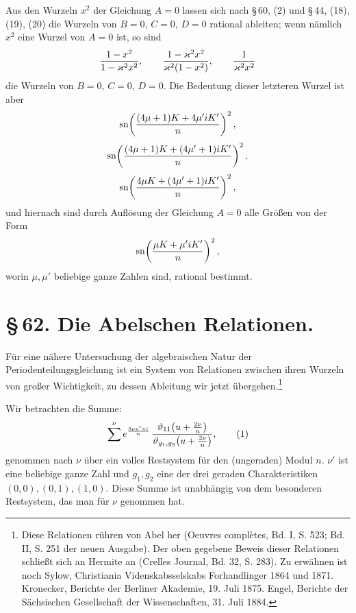 \documentclass[11pt]{article}
\providecommand{\sn}{\operatorname{sn}}
\begin{document}
Aus den Wurzeln $x^2$ der Gleichung $A=0$ lassen sich nach \S\,60, (2) und \S\,44,
(18), (19), (20) die Wurzeln von $B=0$, $C=0$, $D=0$ rational ableiten; wenn nämlich
$x^2$ eine Wurzel von $A=0$ ist, so sind
\[
{1-x^2\over1-\varkappa^2x^2},\qquad
{1-\varkappa^2x^2\over\varkappa^2(1-x^2)},\qquad
{1\over\varkappa^2x^2}
\]
die Wurzeln von $B=0$, $C=0$, $D=0$. Die Bedeutung dieser letzteren Wurzel ist aber
\[
\sn\!\left({(4\mu+1)K+4\mu'iK'\over n}\right)^2,
\]
\[
\sn\!\left({(4\mu+1)K+(4\mu'+1)iK'\over n}\right)^2,
\]
\[
\sn\!\left({4\mu K+(4\mu'+1)iK'\over n}\right)^2,
\]
und hiernach sind durch Auflösung der Gleichung $A=0$ alle Größen von der Form
\[
\sn\!\left({\mu K+\mu'iK'\over n}\right)^2,
\]
worin $\mu,\mu'$ beliebige ganze Zahlen sind, rational bestimmt.

\section*{\S\,62. Die Abelschen Relationen.}

Für eine nähere Untersuchung der algebraischen Natur der Periodenteilungsgleichung ist
ein System von Relationen zwischen ihren Wurzeln von großer Wichtigkeit, zu dessen
Ableitung wir jetzt übergehen.\footnote{Diese Relationen rühren von Abel her (Oeuvres
complètes, Bd. I, S. 523; Bd. II, S. 251 der neuen Ausgabe). Der oben gegebene Beweis
dieser Relationen schließt sich an Hermite an (Crelles Journal, Bd. 32, S. 283).
Zu erwähnen ist noch Sylow, Christiania Videnskabsselskabs Forhandlinger 1864 und
1871. Kronecker, Berichte der Berliner Akademie, 19. Juli 1875. Engel, Berichte der
Sächsischen Gesellschaft der Wissenschaften, 31. Juli 1884.}

Wir betrachten die Summe:
\begin{equation}
\sum^{\nu} e^{\frac{8\nu\nu'\pi i}{n}}\,
{\vartheta_{11}\!\left(u+{2\nu\over n}\right)\over
 \vartheta_{g_1,g_2}\!\left(u+{2\nu\over n}\right)},
\tag{1}
\end{equation}
genommen nach $\nu$ über ein volles Restsystem für den (ungeraden) Modul $n$.
$\nu'$ ist eine beliebige ganze Zahl und $g_1,g_2$ eine der drei geraden Charakteristiken
$(0,0),(0,1),(1,0)$. Diese Summe ist unabhängig von dem besonderen Restsystem, das man
für $\nu$ genommen hat.
\end{document}
